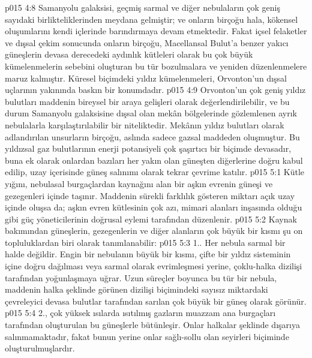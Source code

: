 \vs p015 4:8 Samanyolu galaksisi, geçmiş sarmal ve diğer nebulaların çok geniş sayıdaki birlikteliklerinden meydana gelmiştir; ve onların birçoğu hala, kökensel oluşumlarını kendi içlerinde barındırmaya devam etmektedir. Fakat içsel felaketler ve dışsal çekim sonucunda onların birçoğu, Macellansal Bulut’a benzer yakıcı güneşlerin devasa derecedeki aydınlık kütleleri olarak bu çok büyük kümelenmelerin sebebini oluşturan bu tür bozulmalara ve yeniden düzenlenmelere maruz kalmıştır. Küresel biçimdeki yıldız kümelenmeleri, Orvonton’un dışsal uçlarının yakınında baskın bir konumdadır.
\vs p015 4:9 Orvonton’un çok geniş yıldız bulutları maddenin bireysel bir araya gelişleri olarak değerlendirilebilir, ve bu durum Samanyolu galaksisine dışsal olan mekân bölgelerinde gözlemlenen ayrık nebulalarla karşılaştırılabilir bir niteliktedir. Mekânın yıldız bulutları olarak adlandırılan unsurların birçoğu, aslında sadece gazsal maddeden oluşmuştur. Bu yıldızsal gaz bulutlarının enerji potansiyeli çok şaşırtıcı bir biçimde devasadır, buna ek olarak onlardan bazıları her yakın olan güneşten diğerlerine doğru kabul edilip, uzay içerisinde güneş salınımı olarak tekrar çevrime katılır.
\vs p015 5:1 Kütle yığını, nebulasal burgaçlardan kaynağını alan bir aşkın evrenin güneşi ve gezegenleri içinde taşınır. Maddenin sürekli farklılık gösteren miktarı açık uzay içinde oluşsa da; aşkın evren kütlesinin çok azı, mimari alanları inşasında olduğu gibi güç yöneticilerinin doğrusal eylemi tarafından düzenlenir.
\vs p015 5:2 Kaynak bakımından güneşlerin, gezegenlerin ve diğer alanların çok büyük bir kısmı şu on topluluklardan biri olarak tanımlanabilir:
\vs p015 5:3 1.. Her nebula sarmal bir halde değildir. Engin bir nebulanın büyük bir kısmı, çifte bir yıldız sisteminin içine doğru dağılması veya sarmal olarak evrimleşmesi yerine, çoklu\hyp{}halka dizilişi tarafından yoğunlaşmaya uğrar. Uzun süreçler boyunca bu tür bir nebula, maddenin halka şeklinde görünen dizilişi biçimindeki sayısız miktardaki çevreleyici devasa bulutlar tarafından sarılan çok büyük bir güneş olarak görünür.
\vs p015 5:4 2.\bibnobreakspace {}, çok yüksek ısılarda ısıtılmış gazların muazzam ana burgaçları tarafından oluşturulan bu güneşlerle bütünleşir. Onlar halkalar şeklinde dışarıya salınmamaktadır, fakat bunun yerine onlar sağlı\hyp{}sollu olan seyirleri biçiminde oluşturulmuşlardır.
